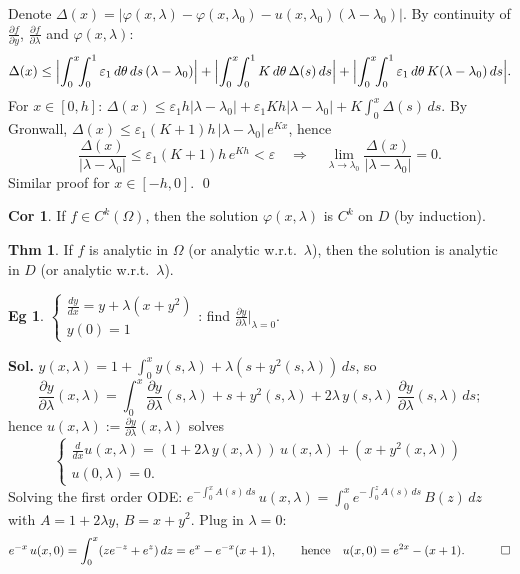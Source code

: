 \documentclass[11pt]{article}
\theoremstyle{definition}
\newtheorem*{theorem}{Thm}
\newtheorem*{corollary}{Cor}
\newtheorem*{example}{Eg}
\theoremstyle{remark}
\begin{document}
Denote $\Delta(x) = | \varphi(x, \lambda) - \varphi(x, \lambda_0) - u(x, \lambda_0)(\lambda - \lambda_0) |$.
By continuity of $\frac{\partial f}{\partial y}$, $\frac{\partial f}{\partial \lambda}$ and
$\varphi(x, \lambda)$:
\[
\Delta(x) \le \Bigl| \int_0^x \!\!\int_0^1 \varepsilon_1\, d\theta\, ds\,(\lambda - \lambda_0) \Bigr|
+ \Bigl| \int_0^x \!\!\int_0^1 K\, d\theta\, \Delta(s)\, ds \Bigr|
+ \Bigl| \int_0^x \!\!\int_0^1 \varepsilon_1\, d\theta\, K(\lambda - \lambda_0)\, ds \Bigr|.
\]
For $x \in [0, h]$: $\Delta(x) \le \varepsilon_1 h |\lambda - \lambda_0| + \varepsilon_1 K h |\lambda - \lambda_0| + K\int_0^x \Delta(s)\, ds$.
By Gronwall, $\Delta(x) \le \varepsilon_1 (K+1) h\, |\lambda - \lambda_0|\, e^{Kx}$, hence
\[
\frac{\Delta(x)}{|\lambda - \lambda_0|} \le \varepsilon_1 (K+1) h\, e^{Kh} < \varepsilon
\quad \Rightarrow \quad \lim_{\lambda \to \lambda_0} \frac{\Delta(x)}{|\lambda - \lambda_0|} = 0.
\]
Similar proof for $x \in [-h, 0]$. \qed

\begin{corollary}
If $f \in C^k(\Omega)$, then the solution $\varphi(x, \lambda)$ is $C^k$ on $D$ (by induction).
\end{corollary}

\begin{theorem}
If $f$ is analytic in $\Omega$ (or analytic w.r.t.\ $\lambda$), then the solution is analytic in $D$
(or analytic w.r.t.\ $\lambda$).
\end{theorem}

\begin{example}
$\begin{cases} \frac{dy}{dx} = y + \lambda(x + y^2) \\ y(0) = 1 \end{cases}$: find
$\frac{\partial y}{\partial \lambda}\big|_{\lambda = 0}$.

\textbf{Sol.} $y(x, \lambda) = 1 + \int_0^x y(s, \lambda) + \lambda(s + y^2(s, \lambda))\, ds$, so
\[
\frac{\partial y}{\partial \lambda}(x, \lambda) = \int_0^x \frac{\partial y}{\partial \lambda}(s, \lambda) + s + y^2(s, \lambda) + 2\lambda\, y(s, \lambda)\, \frac{\partial y}{\partial \lambda}(s, \lambda)\, ds;
\]
hence $u(x, \lambda) := \frac{\partial y}{\partial \lambda}(x, \lambda)$ solves
\[
\begin{cases} \frac{d}{dx} u(x, \lambda) = (1 + 2\lambda\, y(x, \lambda))\, u(x, \lambda) + (x + y^2(x, \lambda)) \\ u(0, \lambda) = 0. \end{cases}
\]
Solving the first order ODE:
$e^{-\int_0^x A(s)\, ds}\, u(x, \lambda) = \int_0^x e^{-\int_0^z A(s)\, ds}\, B(z)\, dz$ with
$A = 1 + 2\lambda y$, $B = x + y^2$. Plug in $\lambda = 0$:
\[
e^{-x}\, u(x, 0) = \int_0^x (z e^{-z} + e^z)\, dz = e^x - e^{-x}(x+1),
\qquad\text{hence}\quad u(x, 0) = e^{2x} - (x+1). \quad\qed
\]
\end{example}
\end{document}
